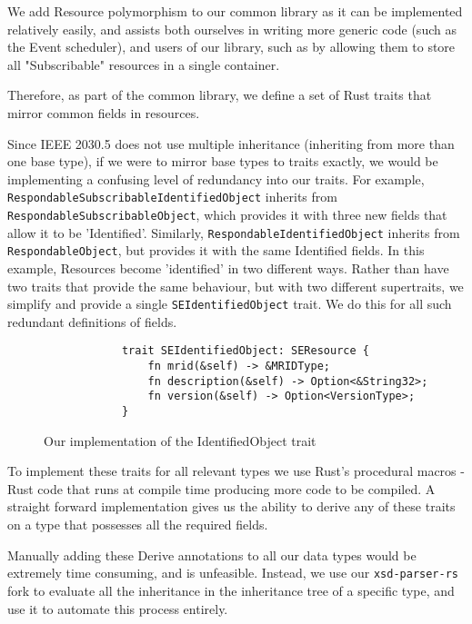 We add Resource polymorphism to our common library as it can be implemented relatively easily, and assists both ourselves in writing more generic code (such as the Event scheduler), and users of our library, such as by allowing them to store all "Subscribable" resources in a single container.

Therefore, as part of the common library, we define a set of Rust traits that mirror common fields in resources. 

Since IEEE 2030.5 does not use multiple inheritance (inheriting from more than one base type), if we were to mirror base types to traits exactly, we would be implementing a confusing level of redundancy into our traits.
For example, \texttt{RespondableSubscribableIdentifiedObject} inherits from \texttt{RespondableSubscribableObject}, which provides it with three new fields that allow it to be 'Identified'. Similarly, \texttt{RespondableIdentifiedObject} inherits from \texttt{RespondableObject}, but provides it with the same Identified fields. In this example, Resources become 'identified' in two different ways. Rather than have two traits that provide the same behaviour, but with two different supertraits, we simplify and provide a single \texttt{SEIdentifiedObject} trait. We do this for all such redundant definitions of fields.

\begin{figure}[H]
    \begin{center}
        \begin{lstlisting}
            trait SEIdentifiedObject: SEResource {
                fn mrid(&self) -> &MRIDType;
                fn description(&self) -> Option<&String32>;
                fn version(&self) -> Option<VersionType>;
            }
        \end{lstlisting}
        \label{fig:identtrait}
        \caption{Our implementation of the IdentifiedObject trait}
    \end{center}
\end{figure}

To implement these traits for all relevant types we use Rust's procedural macros - Rust code that runs at compile time producing more code to be compiled. A straight forward implementation gives us the ability to derive any of these traits on a type that possesses all the required fields.

Manually adding these Derive annotations to all our data types would be extremely time consuming, and is unfeasible. Instead, we use our \texttt{xsd-parser-rs} fork to evaluate all the inheritance in the inheritance tree of a specific type, and use it to automate this process entirely. 

